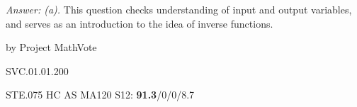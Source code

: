 {\it Answer:  (a).}  This question checks understanding of input and output variables, and serves as an introduction to the idea of inverse functions.

\medskip
by Project MathVote

SVC.01.01.200

STE.075
HC AS MA120 S12: {\bf 91.3}/0/0/8.7  \\
